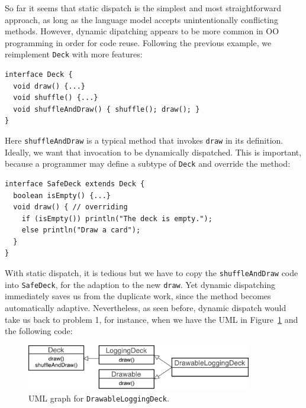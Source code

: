 So far it seems that static dispatch is the simplest and most straightforward approach,
as long as the language model accepts unintentionally conflicting methods. However, dynamic
dipatching appears to be more common in OO programming in order for code reuse. Following the previous example,
we reimplement \lstinline|Deck| with more features:

\vspace{3pt}\begin{lstlisting}
interface Deck {
  void draw() {...}
  void shuffle() {...}
  void shuffleAndDraw() { shuffle(); draw(); }
}
\end{lstlisting}\vspace{3pt}
Here \lstinline|shuffleAndDraw| is a typical method that invokes \lstinline|draw| in its definition. Ideally,
we want that invocation to be dynamically dispatched. This is important, because a programmer may define a subtype
of \lstinline|Deck| and override the method:

\vspace{3pt}\begin{lstlisting}
interface SafeDeck extends Deck {
  boolean isEmpty() {...}
  void draw() { // overriding
    if (isEmpty()) println("The deck is empty.");
    else println("Draw a card");
  }
}
\end{lstlisting}\vspace{3pt}
With static dispatch, it is tedious but we have to copy the \lstinline|shuffleAndDraw| code into \lstinline|SafeDeck|,
for the adaption to the new \lstinline|draw|. Yet dynamic dispatching immediately saves us from the duplicate work,
since the method becomes automatically adaptive. Nevertheless, as seen before, dynamic dispatch would take us back to problem
1, for instance, when we
have the UML in Figure~\ref{fig:drawableloggingdeck} and the following code:

\begin{figure}[t]
	\saveSpaceFig
	\centering
	\includegraphics[height=2cm]{pics/DrawableLoggingDeck.pdf}
	\caption{UML graph for \lstinline|DrawableLoggingDeck|.}\label{fig:drawableloggingdeck}
	\saveSpaceFig
\end{figure}

